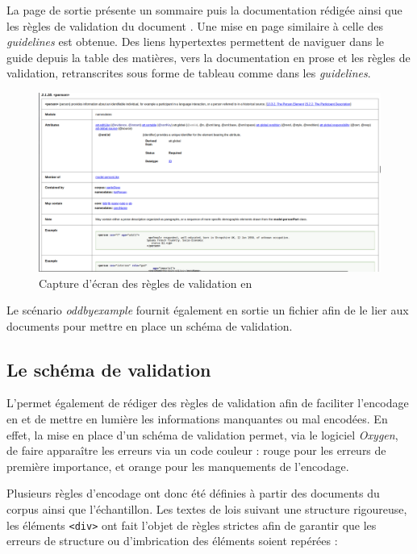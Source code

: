 La page \HTML de sortie présente un sommaire puis la documentation rédigée ainsi que les règles de validation du document \TEI. Une mise en page similaire à celle des \textit{guidelines} est obtenue. Des liens hypertextes permettent de naviguer dans le guide depuis la table des matières, vers la documentation en prose et les règles de validation, retranscrites sous forme de tableau comme dans les \textit{guidelines}.

\begin{figure}
    \centering
    \includegraphics[width=\textwidth]{images/odd2.png}
    \caption{Capture d'écran des règles de validation en \HTML}
\end{figure}

Le scénario \textit{oddbyexample} fournit également en sortie un fichier \RNG afin de le lier aux documents \TEI pour mettre en place un schéma de validation.

\newpage
\subsection{Le schéma de validation}

L'\ODD permet également de rédiger des règles de validation afin de faciliter l'encodage en \TEI et de mettre en lumière les informations manquantes ou mal encodées. En effet, la mise en place d'un schéma de validation permet, via le logiciel \textit{Oxygen}, de faire apparaître les erreurs via un code couleur : rouge pour les erreurs de première importance, et orange pour les manquements de l'encodage. 

Plusieurs règles d'encodage ont donc été définies à partir des documents du corpus ainsi que l'échantillon. Les textes de lois suivant une structure rigoureuse, les éléments \texttt{<div>} ont fait l'objet de règles strictes afin de garantir que les erreurs de structure ou d'imbrication des éléments soient repérées : 

